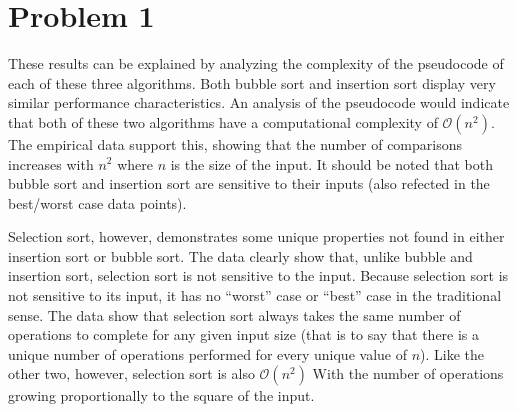 \documentclass{article}
\newenvironment{problem}[1]{
  \nobreak\section*{Problem #1}
}{}
\begin{document}
\begin{problem}{1}
    \par
    These results can be explained by analyzing the complexity of the 
    pseudocode of each of these three algorithms.  Both bubble sort and 
    insertion sort display very similar performance characteristics.  An 
    analysis of the pseudocode would indicate that both of these two 
    algorithms have a computational complexity of  $\mathcal{O}(n^2)$.  
    The empirical data support this, showing that the number of comparisons 
    increases with $n^2$ where $n$ is the size of the input.  It should be 
    noted that both bubble sort and insertion sort are sensitive to their 
    inputs (also refected in the best/worst case data points).

    \par
    Selection sort, however, demonstrates some unique properties not found in 
    either insertion sort or bubble sort.  The data clearly show that, unlike 
    bubble and insertion sort, selection sort is not sensitive to the input.  
    Because selection sort is not sensitive to its input, it has no “worst” 
    case or “best” case in the traditional sense.  The data show that 
    selection sort always takes the same number of operations to complete for 
    any given input size (that is to say that there is a unique number of 
    operations performed for every unique value of $n$).  Like the other two, 
    however, selection sort is also $\mathcal{O}(n^2)$ With the number of 
    operations growing proportionally to the square of the input.
  \end{problem}

  \pagebreak
\end{document}
